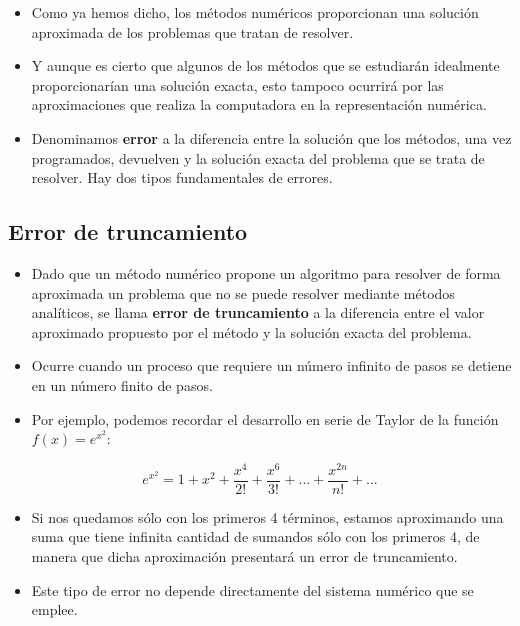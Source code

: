 \documentclass[openany]{book}
\providecommand{\tightlist}{%
  \setlength{\itemsep}{0pt}\setlength{\parskip}{0pt}}
\begin{document}
\begin{itemize}
\tightlist
\item
  Como ya hemos dicho, los métodos numéricos proporcionan una solución aproximada de los problemas que tratan de resolver.
\item
  Y aunque es cierto que algunos de los métodos que se estudiarán idealmente proporcionarían una solución exacta, esto tampoco ocurrirá por las aproximaciones que realiza la computadora en la representación numérica.
\item
  Denominamos \textbf{error} a la diferencia entre la solución que los métodos, una vez programados, devuelven y la solución exacta del problema que se trata de resolver. Hay dos tipos fundamentales de errores.
\end{itemize}

\hypertarget{error-de-truncamiento}{%
\subsection{Error de truncamiento}\label{error-de-truncamiento}}

\begin{itemize}
\tightlist
\item
  Dado que un método numérico propone un algoritmo para resolver de forma aproximada un problema que no se puede resolver mediante métodos analíticos, se llama \textbf{error de truncamiento} a la diferencia entre el valor aproximado propuesto por el método y la solución exacta del problema.
\item
  Ocurre cuando un proceso que requiere un número infinito de pasos se detiene en un número finito de pasos.
\item
  Por ejemplo, podemos recordar el desarrollo en serie de Taylor de la función \(f(x) = e^{x^2}\):
\end{itemize}

\[ e^{x^2} = 1 + x^2 + \frac{x^4}{2!} + \frac{x^6}{3!} + ... + \frac{x^{2n}}{n!} + ...\]

\begin{itemize}
\tightlist
\item
  Si nos quedamos sólo con los primeros 4 términos, estamos aproximando una suma que tiene infinita cantidad de sumandos sólo con los primeros 4, de manera que dicha aproximación presentará un error de truncamiento.
\item
  Este tipo de error no depende directamente del sistema numérico que se emplee.
\end{itemize}
\end{document}
